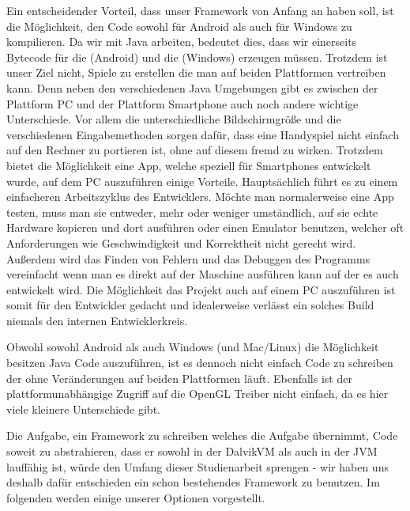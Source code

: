 Ein entscheidender Vorteil, dass unser Framework von Anfang an haben soll, ist die Möglichkeit, den Code sowohl für Android als auch für Windows zu kompilieren.
Da wir mit Java arbeiten, bedeutet dies, dass wir einerseits Bytecode für die  (Android) und die  (Windows) erzeugen müssen.
Trotzdem ist unser Ziel nicht, Spiele zu erstellen die man auf beiden Plattformen vertreiben kann.
Denn neben den verschiedenen Java Umgebungen gibt es zwischen der Plattform PC und der Plattform Smartphone auch noch andere wichtige Unterschiede.
Vor allem die unterschiedliche Bildschirmgröße und die verschiedenen Eingabemethoden sorgen dafür, dass eine Handyspiel nicht einfach auf den Rechner zu portieren ist, ohne auf diesem fremd zu wirken.
Trotzdem bietet die Möglichkeit eine App, welche speziell für Smartphones entwickelt wurde, auf dem PC auszuführen einige Vorteile.
Hauptsächlich führt es zu einem einfacheren Arbeitszyklus des Entwicklers. Möchte man normalerweise eine App testen, muss man sie entweder, mehr oder weniger umständlich, auf sie echte Hardware kopieren und dort ausführen oder einen Emulator benutzen, welcher oft Anforderungen wie Geschwindigkeit und Korrektheit nicht gerecht wird. Außerdem wird das Finden von Fehlern und das Debuggen des Programms vereinfacht wenn man es direkt auf der Maschine ausführen kann auf der es auch entwickelt wird.
Die Möglichkeit das Projekt auch auf einem PC auszuführen ist somit für den Entwickler gedacht und idealerweise verlässt ein solches Build niemals den internen Entwicklerkreis.


Obwohl sowohl Android als auch Windows (und Mac/Linux) die Möglichkeit besitzen Java Code auszuführen, ist es dennoch nicht einfach Code zu schreiben der ohne Veränderungen auf beiden Plattformen läuft. Ebenfalls ist der plattformunabhängige Zugriff auf die OpenGL Treiber nicht einfach, da es hier viele kleinere Unterschiede gibt.

Die Aufgabe, ein Framework zu schreiben welches die Aufgabe übernimmt, Code soweit zu abstrahieren, dass er sowohl in der DalvikVM als auch in der JVM lauffähig ist, würde den Umfang dieser Studienarbeit sprengen - wir haben uns deshalb dafür entschieden ein schon bestehendes Framework zu benutzen. Im folgenden werden einige unserer Optionen vorgestellt.